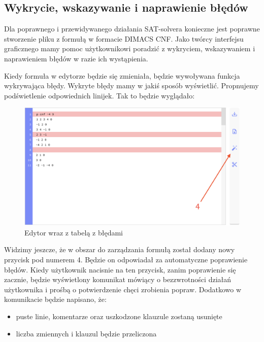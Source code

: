 \documentclass[a4paper,12pt,oneside]{book}
\theoremstyle{definition}
\begin{document}
\newpage

\subsection{Wykrycie, wskazywanie i naprawienie błędów}

Dla poprawnego i przewidywanego działania SAT-solvera konieczne jest poprawne stworzenie pliku z formułą w formacie DIMACS CNF. Jako twórcy interfejsu graficznego mamy pomoc użytkownikowi poradzić z wykryciem, wskazywaniem i naprawieniem błędów w razie ich wystąpienia. 

Kiedy formuła w edytorze będzie się zmieniała, będzie wywoływana funkcja wykrywająca błędy. Wykryte błędy mamy w jakiś sposób wyświetlić. Propnujemy podświetlenie odpowiednich linijek. Tak to będzie wyglądało: 

\begin{figure}[ht]
    \centering
    \includegraphics[width=14.30cm]{4}
    \caption{Edytor wraz z tabelą z błędami}
    \label{fig:4}
\end{figure}

\noindent Widzimy jeszcze, że w obszar do zarządzania formułą został dodany nowy przycisk pod numerem 4. Będzie on odpowiadał za automatyczne poprawienie błędów. Kiedy użytkownik nacisnie na ten przycisk, zanim poprawienie się zacznie, będzie wyświetlony komunikat mówiący o bezzwrotności działań użytkownika i prośbą o potwierdzenie chęci zrobienia popraw. Dodatkowo w komunikacie będzie napisano, że: 

\begin{itemize}
    \item puste linie, komentarze oraz uszkodzone klauzule zostaną usunięte
    \item liczba zmiennych i klauzul będzie przeliczona
\end{itemize}
\end{document}
